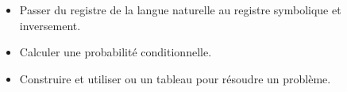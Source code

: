 \documentclass[12pt]{article}
\theoremstyle{break}
\begin{document}
\begin{savoir}{}{}
\begin{itemize}
  \item Passer du registre de la langue naturelle au registre symbolique et inversement.
  \item Calculer une probabilité conditionnelle.
  \item Construire et utiliser ou un tableau pour résoudre un problème.
\end{itemize}
\end{savoir}
\end{document}
